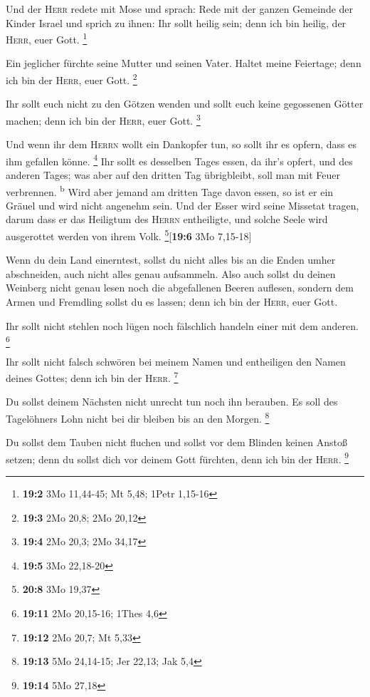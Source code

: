  Und der \textsc{Herr} redete mit Mose und sprach:
 Rede mit der ganzen Gemeinde der Kinder Israel und sprich
zu ihnen: Ihr sollt heilig sein; denn ich bin heilig, der \textsc{Herr},
euer Gott. \footnote{\textbf{19:2} 3Mo 11,44-45; Mt 5,48; 1Petr 1,15-16}

 Ein jeglicher fürchte seine Mutter und seinen Vater.
Haltet meine Feiertage; denn ich bin der \textsc{Herr}, euer Gott.
\footnote{\textbf{19:3} 2Mo 20,8; 2Mo 20,12}

 Ihr sollt euch nicht zu den Götzen wenden und sollt euch
keine gegossenen Götter machen; denn ich bin der \textsc{Herr}, euer
Gott. \footnote{\textbf{19:4} 2Mo 20,3; 2Mo 34,17}

 Und wenn ihr dem \textsc{Herrn} wollt ein Dankopfer tun,
so sollt ihr es opfern, dass es ihm gefallen könne. \footnote{\textbf{19:5}
  3Mo 22,18-20}  Ihr sollt es desselben Tages essen, da
ihr's opfert, und des anderen Tages; was aber auf den dritten Tag
übrigbleibt, soll man mit Feuer verbrennen. \textsuperscript{b}
 Wird aber jemand am dritten Tage davon essen, so ist er
ein Gräuel und wird nicht angenehm sein.  Und der Esser
wird seine Missetat tragen, darum dass er das Heiligtum des
\textsc{Herrn} entheiligte, und solche Seele wird ausgerottet werden von
ihrem Volk. \footnote{\textbf{20:8} 3Mo 19,37}{[}\textbf{19:6} 3Mo
7,15-18{]}

 Wenn du dein Land einerntest, sollst du nicht alles bis
an die Enden umher abschneiden, auch nicht alles genau aufsammeln.
 Also auch sollst du deinen Weinberg nicht genau lesen
noch die abgefallenen Beeren auflesen, sondern dem Armen und Fremdling
sollst du es lassen; denn ich bin der \textsc{Herr}, euer Gott.

 Ihr sollt nicht stehlen noch lügen noch fälschlich
handeln einer mit dem anderen. \footnote{\textbf{19:11} 2Mo 20,15-16;
  1Thes 4,6}

 Ihr sollt nicht falsch schwören bei meinem Namen und
entheiligen den Namen deines Gottes; denn ich bin der \textsc{Herr}.
\footnote{\textbf{19:12} 2Mo 20,7; Mt 5,33}

 Du sollst deinem Nächsten nicht unrecht tun noch ihn
berauben. Es soll des Tagelöhners Lohn nicht bei dir bleiben bis an den
Morgen. \footnote{\textbf{19:13} 5Mo 24,14-15; Jer 22,13; Jak 5,4}

 Du sollst dem Tauben nicht fluchen und sollst vor dem
Blinden keinen Anstoß setzen; denn du sollst dich vor deinem Gott
fürchten, denn ich bin der \textsc{Herr}. \footnote{\textbf{19:14} 5Mo
  27,18}

